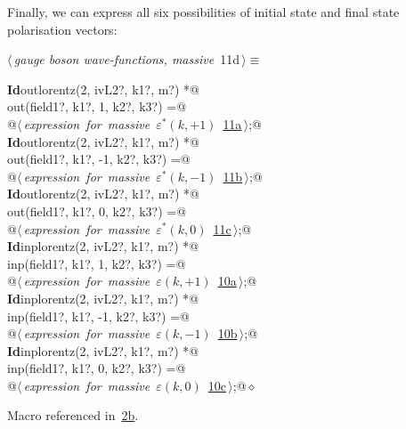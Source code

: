 \documentclass[a4paper,12pt]{amsart}
\renewcommand{\NWtarget}[2]{\hypertarget{#1}{#2}}
\renewcommand{\NWlink}[2]{\hyperlink{#1}{#2}}
\renewcommand{\NWtxtMacroRefIn}{Macro referenced in}
\renewcommand{\NWsep}{${\diamond}$}
\begin{document}
Finally, we can express all six possibilities of initial state
and final state polarisation vectors:
\begin{flushleft} \small\label{scrap30}\raggedright\small
\NWtarget{nuweb11d}{} $\langle\,${\itshape gauge boson wave-functions, massive}\nobreak\ {\footnotesize {11d}}$\,\rangle\equiv$
\vspace{-1ex}
\begin{list}{}{} \item
\mbox{}\verb@@\hbox{\sffamily\bfseries Id}\verb@ outlorentz(2, ivL2?, k1?, m?) *@\\
\mbox{}\verb@      out(field1?, k1?,  1, k2?, k3?) =@\\
\mbox{}\verb@   @\hbox{$\langle\,${\itshape expression for massive $\varepsilon^\ast(k, +1)$}\nobreak\ {\footnotesize \NWlink{nuweb11a}{11a}}$\,\rangle$}\verb@;@\\
\mbox{}\verb@@\hbox{\sffamily\bfseries Id}\verb@ outlorentz(2, ivL2?, k1?, m?) *@\\
\mbox{}\verb@      out(field1?, k1?, -1, k2?, k3?) =@\\
\mbox{}\verb@   @\hbox{$\langle\,${\itshape expression for massive $\varepsilon^\ast(k, -1)$}\nobreak\ {\footnotesize \NWlink{nuweb11b}{11b}}$\,\rangle$}\verb@;@\\
\mbox{}\verb@@\hbox{\sffamily\bfseries Id}\verb@ outlorentz(2, ivL2?, k1?, m?) *@\\
\mbox{}\verb@      out(field1?, k1?,  0, k2?, k3?) =@\\
\mbox{}\verb@   @\hbox{$\langle\,${\itshape expression for massive $\varepsilon^\ast(k, 0)$}\nobreak\ {\footnotesize \NWlink{nuweb11c}{11c}}$\,\rangle$}\verb@;@\\
\mbox{}\verb@@\hbox{\sffamily\bfseries Id}\verb@ inplorentz(2, ivL2?, k1?, m?) *@\\
\mbox{}\verb@      inp(field1?, k1?,  1, k2?, k3?) =@\\
\mbox{}\verb@   @\hbox{$\langle\,${\itshape expression for massive $\varepsilon(k, +1)$}\nobreak\ {\footnotesize \NWlink{nuweb10a}{10a}}$\,\rangle$}\verb@;@\\
\mbox{}\verb@@\hbox{\sffamily\bfseries Id}\verb@ inplorentz(2, ivL2?, k1?, m?) *@\\
\mbox{}\verb@      inp(field1?, k1?, -1, k2?, k3?) =@\\
\mbox{}\verb@   @\hbox{$\langle\,${\itshape expression for massive $\varepsilon(k, -1)$}\nobreak\ {\footnotesize \NWlink{nuweb10b}{10b}}$\,\rangle$}\verb@;@\\
\mbox{}\verb@@\hbox{\sffamily\bfseries Id}\verb@ inplorentz(2, ivL2?, k1?, m?) *@\\
\mbox{}\verb@      inp(field1?, k1?,  0, k2?, k3?) =@\\
\mbox{}\verb@   @\hbox{$\langle\,${\itshape expression for massive $\varepsilon(k, 0)$}\nobreak\ {\footnotesize \NWlink{nuweb10c}{10c}}$\,\rangle$}\verb@;@{\NWsep}
\end{list}
\vspace{-1.5ex}
\footnotesize
\begin{list}{}{\setlength{\itemsep}{-\parsep}\setlength{\itemindent}{-\leftmargin}}
\item \NWtxtMacroRefIn\ \NWlink{nuweb2b}{2b}.


\end{list}
\end{flushleft}
\end{document}

